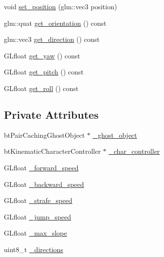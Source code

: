\begin{DoxyCompactItemize}
void \hyperlink{classPhysicsPlayerController_a1e1c3163016b2ca99b1edd3f30e58214}{set\+\_\+position} (glm\+::vec3 position)
\item 
glm\+::quat \hyperlink{classPhysicsPlayerController_a276711b873a6520fd01c4834c20bd37b}{get\+\_\+orientation} () const 
\item 
glm\+::vec3 \hyperlink{classPhysicsPlayerController_aa7ffb4df3b50b550f33d2d64a76ee57b}{get\+\_\+direction} () const 
\item 
G\+Lfloat \hyperlink{classPhysicsPlayerController_a1ffac5f72a1c4db9fb126e9c820615ef}{get\+\_\+yaw} () const 
\item 
G\+Lfloat \hyperlink{classPhysicsPlayerController_a5c16cff5a570099d9b4f4ed0d0939509}{get\+\_\+pitch} () const 
\item 
G\+Lfloat \hyperlink{classPhysicsPlayerController_a4f59ca49508ea75f5c608323e4af5019}{get\+\_\+roll} () const 
\end{DoxyCompactItemize}
\subsection*{Private Attributes}
\begin{DoxyCompactItemize}
\item 
bt\+Pair\+Caching\+Ghost\+Object $\ast$ \hyperlink{classPhysicsPlayerController_ac8839101912598ae6c620c76864665e1}{\+\_\+ghost\+\_\+object}
\item 
bt\+Kinematic\+Character\+Controller $\ast$ \hyperlink{classPhysicsPlayerController_acb97f8a1c4155bd6b269fc7276484dc5}{\+\_\+char\+\_\+controller}
\item 
G\+Lfloat \hyperlink{classPhysicsPlayerController_a765afe9efa2c07cce8c0531b2bc220c9}{\+\_\+forward\+\_\+speed}
\item 
G\+Lfloat \hyperlink{classPhysicsPlayerController_acba91da49b4a1fcd492624763376ae67}{\+\_\+backward\+\_\+speed}
\item 
G\+Lfloat \hyperlink{classPhysicsPlayerController_a0650942e3b59e8598ab70d649d9823a9}{\+\_\+strafe\+\_\+speed}
\item 
G\+Lfloat \hyperlink{classPhysicsPlayerController_a768842aa2f729fafe55ec1308708f006}{\+\_\+jump\+\_\+speed}
\item 
G\+Lfloat \hyperlink{classPhysicsPlayerController_a29cffd08733c1fb185ed3fdbfaa9e045}{\+\_\+max\+\_\+slope}
\item 
uint8\+\_\+t \hyperlink{classPhysicsPlayerController_a21fb45f73d246a1fa5c6aa36525d3a85}{\+\_\+directions}
\end{DoxyCompactItemize}



